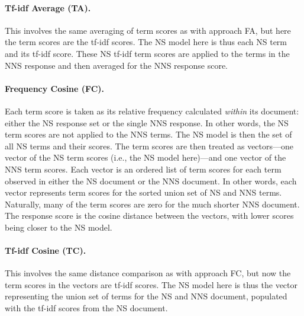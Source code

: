 \paragraph{Tf-idf Average (TA).} This involves the same
averaging of term scores as with approach FA, but here the term scores are the tf-idf scores. The NS model here is thus each NS term and its tf-idf score. These NS tf-idf term scores are applied to the terms in the NNS response and then averaged for the NNS response score. 

\paragraph{Frequency Cosine (FC).} Each term score is taken as its relative frequency calculated \textit{within} its document: either the NS response set or the single NNS response. In other words, the NS term scores are not applied to the NNS terms. The NS model is then the set of all NS terms and their scores. The term scores are then treated as vectors---one vector of the NS term scores (i.e., the NS model here)---and one vector of the NNS term scores. Each vector is an ordered list of term scores for each term observed in either the NS document or the NNS document. In other words, each vector represents term scores for the sorted union set of NS and NNS terms. Naturally, many of the term scores are zero for the much shorter NNS document. The response score is the cosine distance between the vectors, with lower scores being closer to the NS model.

\paragraph{Tf-idf Cosine (TC).} This involves the same distance comparison as with approach FC, but now the term scores in the vectors are tf-idf scores. The NS model here is thus the vector representing the union set of terms for the NS and NNS document, populated with the tf-idf scores from the NS document.

\bigskip

